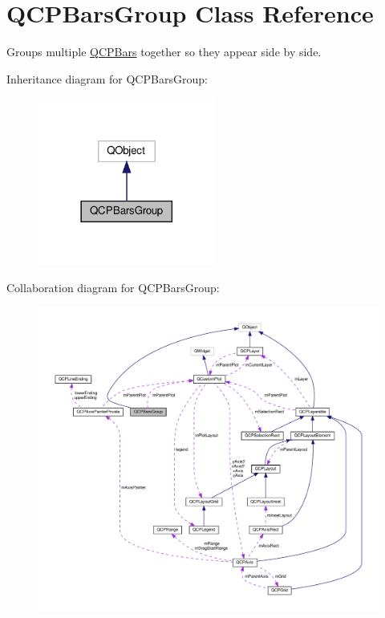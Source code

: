 \hypertarget{classQCPBarsGroup}{}\section{Q\+C\+P\+Bars\+Group Class Reference}
\label{classQCPBarsGroup}


Groups multiple \hyperlink{classQCPBars}{Q\+C\+P\+Bars} together so they appear side by side.  




Inheritance diagram for Q\+C\+P\+Bars\+Group\+:\nopagebreak
\begin{figure}[H]
\begin{center}
\leavevmode
\includegraphics[width=165pt]{classQCPBarsGroup__inherit__graph}
\end{center}
\end{figure}


Collaboration diagram for Q\+C\+P\+Bars\+Group\+:\nopagebreak
\begin{figure}[H]
\begin{center}
\leavevmode
\includegraphics[width=350pt]{classQCPBarsGroup__coll__graph}
\end{center}
\end{figure}
